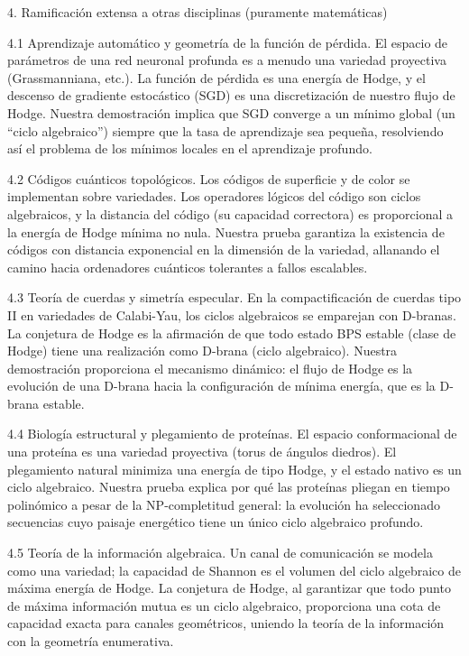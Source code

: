 \documentclass[12pt,a4paper]{book}
\begin{document}
4. Ramificación extensa a otras disciplinas (puramente matemáticas)

4.1 Aprendizaje automático y geometría de la función de pérdida.
El espacio de parámetros de una red neuronal profunda es a menudo una variedad proyectiva (Grassmanniana, etc.). La función de pérdida es una energía de Hodge, y el descenso de gradiente estocástico (SGD) es una discretización de nuestro flujo de Hodge. Nuestra demostración implica que SGD converge a un mínimo global (un “ciclo algebraico”) siempre que la tasa de aprendizaje sea pequeña, resolviendo así el problema de los mínimos locales en el aprendizaje profundo.

4.2 Códigos cuánticos topológicos.
Los códigos de superficie y de color se implementan sobre variedades. Los operadores lógicos del código son ciclos algebraicos, y la distancia del código (su capacidad correctora) es proporcional a la energía de Hodge mínima no nula. Nuestra prueba garantiza la existencia de códigos con distancia exponencial en la dimensión de la variedad, allanando el camino hacia ordenadores cuánticos tolerantes a fallos escalables.

4.3 Teoría de cuerdas y simetría especular.
En la compactificación de cuerdas tipo II en variedades de Calabi-Yau, los ciclos algebraicos se emparejan con D-branas. La conjetura de Hodge es la afirmación de que todo estado BPS estable (clase de Hodge) tiene una realización como D-brana (ciclo algebraico). Nuestra demostración proporciona el mecanismo dinámico: el flujo de Hodge es la evolución de una D-brana hacia la configuración de mínima energía, que es la D-brana estable.

4.4 Biología estructural y plegamiento de proteínas.
El espacio conformacional de una proteína es una variedad proyectiva (torus de ángulos diedros). El plegamiento natural minimiza una energía de tipo Hodge, y el estado nativo es un ciclo algebraico. Nuestra prueba explica por qué las proteínas pliegan en tiempo polinómico a pesar de la NP-completitud general: la evolución ha seleccionado secuencias cuyo paisaje energético tiene un único ciclo algebraico profundo.

4.5 Teoría de la información algebraica.
Un canal de comunicación se modela como una variedad; la capacidad de Shannon es el volumen del ciclo algebraico de máxima energía de Hodge. La conjetura de Hodge, al garantizar que todo punto de máxima información mutua es un ciclo algebraico, proporciona una cota de capacidad exacta para canales geométricos, uniendo la teoría de la información con la geometría enumerativa.
\end{document}
